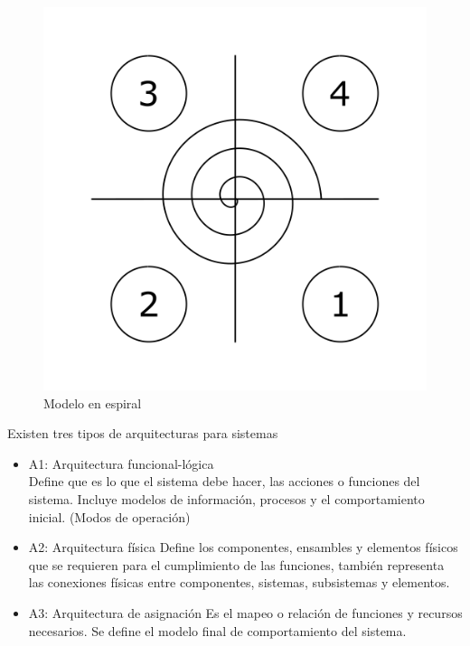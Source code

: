 \begin{enumerate}
    \begin{figure}[h!]
    \centering
        \includegraphics[scale=0.30]{Proyecto Integrador Figuras/02 Modelo Espiral.png}
        \caption{Modelo en espiral}
    \end{figure}

    Existen tres tipos de arquitecturas para sistemas
    
    \begin{itemize}
        \item A1: Arquitectura funcional-lógica\\
            Define que es lo que el sistema debe hacer, las acciones o funciones del sistema. Incluye modelos de información, procesos y el comportamiento inicial. (Modos de operación)
        \item A2: Arquitectura física
            Define los componentes, ensambles y elementos físicos que se requieren para el cumplimiento de las funciones, también representa las conexiones físicas entre componentes, sistemas, subsistemas y elementos.
        \item A3: Arquitectura de asignación
            Es el mapeo o relación de funciones y recursos necesarios. Se define el modelo final de comportamiento del sistema.
    \end{itemize}
\end{enumerate}

